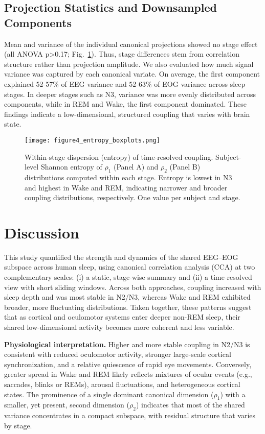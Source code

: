\subsection{Projection Statistics and Downsampled Components}
\vspace{0pt}%
Mean and variance of the individual canonical projections showed no stage effect (all ANOVA p>0.17; Fig.~\ref{fig:figure4}). Thus, stage differences stem from correlation structure rather than projection amplitude.
We also evaluated how much signal variance was captured by each canonical variate. On average, the first component explained 52-57\% of EEG variance and 52-63\% of EOG variance across sleep stages. In deeper stages such as N3, variance was more evenly distributed across components, while in REM and Wake, the first component dominated. These findings indicate a low-dimensional, structured coupling that varies with brain state.%
\begin{figure}[!t]
\centering
\texttt{[image: figure4\_entropy\_boxplots.png]}%
\caption{Within-stage dispersion (entropy) of time-resolved coupling. Subject-level Shannon entropy of $\rho_1$ (Panel A) and $\rho_2$ (Panel B) distributions computed within each stage. Entropy is lowest in N3 and highest in Wake and REM, indicating narrower and broader coupling distributions, respectively. One value per subject and stage.}\label{fig:figure4}
\end{figure}%
\vspace{0pt}%

\section{Discussion}
This study quantified the strength and dynamics of the shared EEG--EOG subspace across human sleep, using canonical correlation analysis (CCA) at two complementary scales: (i) a static, stage-wise summary and (ii) a time-resolved view with short sliding windows. Across both approaches, coupling increased with sleep depth and was most stable in N2/N3, whereas Wake and REM exhibited broader, more fluctuating distributions. Taken together, these patterns suggest that as cortical and oculomotor systems enter deeper non-REM sleep, their shared low-dimensional activity becomes more coherent and less variable.

\textbf{Physiological interpretation.}
Higher and more stable coupling in N2/N3 is consistent with reduced oculomotor activity, stronger large-scale cortical synchronization, and a relative quiescence of rapid eye movements. Conversely, greater spread in Wake and REM likely reflects mixtures of ocular events (e.g., saccades, blinks or REMs), arousal fluctuations, and heterogeneous cortical states. The prominence of a single dominant canonical dimension ($\rho_1$) with a smaller, yet present, second dimension ($\rho_2$) indicates that most of the shared variance concentrates in a compact subspace, with residual structure that varies by stage.


